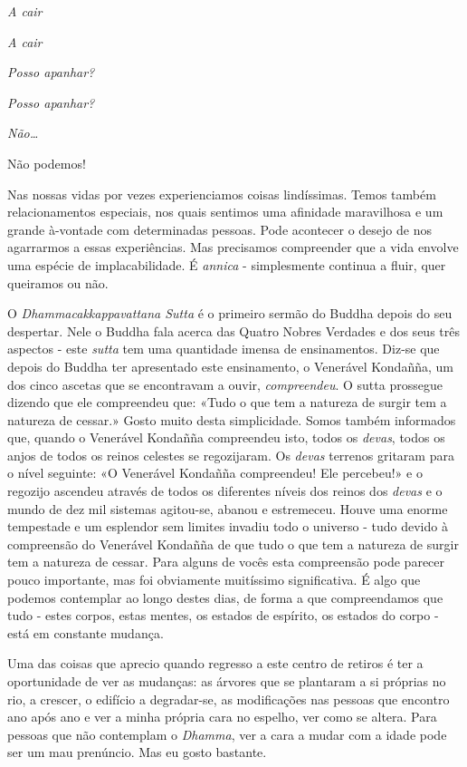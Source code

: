\emph{A cair}

\emph{A cair}

\emph{Posso apanhar?}

\emph{Posso apanhar?}

\emph{Não\ldots{}}

Não podemos!

Nas nossas vidas por vezes experienciamos coisas lindíssimas. Temos
também relacionamentos especiais, nos quais sentimos uma afinidade
maravilhosa e um grande à-vontade com determinadas pessoas. Pode
acontecer o desejo de nos agarrarmos a essas experiências. Mas
precisamos compreender que a vida envolve uma espécie de
implacabilidade. É \emph{annica} - simplesmente continua a fluir, quer
queiramos ou não.

O \emph{Dhammacakkappavattana Sutta} é o primeiro sermão do Buddha
depois do seu despertar. Nele o Buddha fala acerca das Quatro Nobres
Verdades e dos seus três aspectos - este \emph{sutta} tem uma quantidade
imensa de ensinamentos. Diz-se que depois do Buddha ter apresentado este
ensinamento, o Venerável Kondañña, um dos cinco ascetas que se
encontravam a ouvir, \emph{compreendeu}. O sutta prossegue dizendo que
ele compreendeu que: «Tudo o que tem a natureza de surgir tem a natureza
de cessar.» Gosto muito desta simplicidade. Somos também informados que,
quando o Venerável Kondañña compreendeu isto, todos os \emph{devas},
todos os anjos de todos os reinos celestes se regozijaram. Os
\emph{devas} terrenos gritaram para o nível seguinte: «O Venerável
Kondañña compreendeu! Ele percebeu!» e o regozijo ascendeu através de
todos os diferentes níveis dos reinos dos \emph{devas} e o mundo de dez
mil sistemas agitou-se, abanou e estremeceu. Houve uma enorme tempestade
e um esplendor sem limites invadiu todo o universo - tudo devido à
compreensão do Venerável Kondañña de que tudo o que tem a natureza de
surgir tem a natureza de cessar. Para alguns de vocês esta compreensão
pode parecer pouco importante, mas foi obviamente muitíssimo
significativa. É algo que podemos contemplar ao longo destes dias, de
forma a que compreendamos que tudo - estes corpos, estas mentes, os
estados de espírito, os estados do corpo - está em constante mudança.

Uma das coisas que aprecio quando regresso a este centro de retiros é
ter a oportunidade de ver as mudanças: as árvores que se plantaram a si
próprias no rio, a crescer, o edifício a degradar-se, as modificações
nas pessoas que encontro ano após ano e ver a minha própria cara no
espelho, ver como se altera. Para pessoas que não contemplam o
\emph{Dhamma}, ver a cara a mudar com a idade pode ser um mau prenúncio.
Mas eu gosto bastante.

